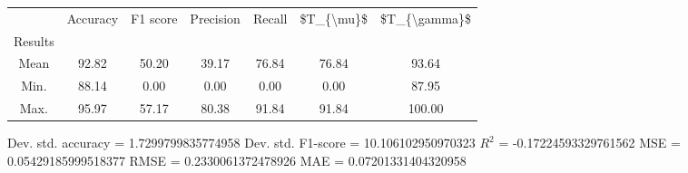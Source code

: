 \begin{tabular}{|c|c|c|c|c|c|c|}
\toprule
{} &  Accuracy &  F1 score &  Precision &  Recall &  \$T\_\{\textbackslash mu\}\$ &  \$T\_\{\textbackslash gamma\}\$ \\
Results &           &           &            &         &            &               \\
\hline
Mean    &     92.82 &     50.20 &      39.17 &   76.84 &      76.84 &         93.64 \\
Min.    &     88.14 &      0.00 &       0.00 &    0.00 &       0.00 &         87.95 \\
Max.    &     95.97 &     57.17 &      80.38 &   91.84 &      91.84 &        100.00 \\
\bottomrule
\end{tabular}

 Dev. std. accuracy = 1.7299799835774958
 Dev. std. F1-score = 10.106102950970323
 $R^2$ = -0.17224593329761562
 MSE = 0.05429185999518377
 RMSE = 0.2330061372478926
 MAE = 0.07201331404320958